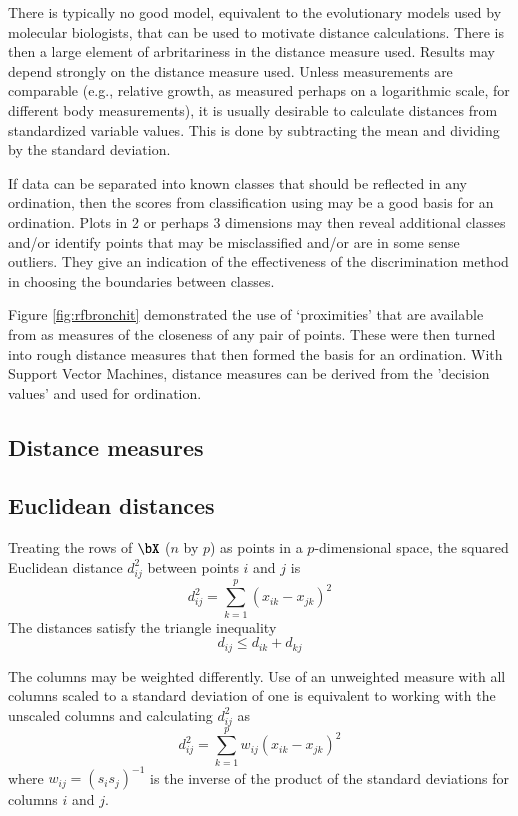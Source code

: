 There is typically no good model, equivalent
to the evolutionary models used by molecular biologists, that can be
used to motivate distance calculations.  There is then a large element
of arbritariness in the distance measure used.
Results may depend strongly on the distance measure used.  Unless
measurements are comparable (e.g., relative growth, as measured
perhaps on a logarithmic scale, for different body measurements), it
is usually desirable to calculate distances from standardized variable
values.  This is done by subtracting the mean and dividing by the
standard deviation.

If data can be separated into known classes that should be reflected
in any ordination, then the scores from classification using
 may be a good basis for an ordination. Plots in 2 or
perhaps 3 dimensions may then reveal additional classes and/or
identify points that may be misclassified and/or are in some sense
outliers.  They give an indication of the effectiveness of the
discrimination method in choosing the boundaries between classes.

Figure \ref{fig:rfbronchit} demonstrated the use of `proximities'
that are available from  as measures of the
closeness of any pair of points.  These were then turned into rough
distance measures that then formed the basis for an ordination.  With
Support Vector Machines, distance measures can be derived from the
'decision values' and used for ordination.

\subsection{Distance measures}

\subsection*{Euclidean distances}

Treating the rows of $\bX$ ($n$ by $p$) as points in a $p$-dimensional
space, the squared Euclidean distance  $d_{ij}^2$ between points $i$ and $j$ is
\[
 d_{ij}^2 = \sum_{k=1}^p (x_{ik}-x_{jk})^2
\]
The distances satisfy the triangle inequality
\[ d_{ij} \le d_{ik} + d_{kj} \]

The columns may be weighted differently.
Use of an unweighted measure with all columns scaled to a standard
deviation of one is equivalent to working with the unscaled columns
and calculating $d_{ij}^2$ as
\[
d_{ij}^2 = \sum_{k=1}^p w_{ij} (x_{ik}-x_{jk})^2
\]
where $w_{ij} = (s_i s_j)^{-1}$ is the inverse of the product of
the standard deviations for columns $i$ and $j$.

